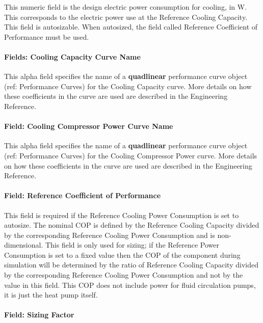 This numeric field is the design electric power consumption for cooling, in W. This corresponds to the electric power use at the Reference Cooling Capacity. This field is autosizable. When autosized, the field called Reference Coefficient of Performance must be used.

\paragraph{Fields: Cooling Capacity Curve Name}\label{fields-cooling-capacity-curve-name}

This alpha field specifies the name of a \textbf{quadlinear} performance curve object (ref: Performance Curves) for the Cooling Capacity curve. More details on how these coefficients in the curve are used are described in the Engineering Reference.

\paragraph{Field: Cooling Compressor Power Curve Name}\label{field-cooling-compressor-power-curve-name}

This alpha field specifies the name of a \textbf{quadlinear} performance curve object (ref: Performance Curves) for the Cooling Compressor Power curve. More details on how these coefficients in the curve are used are described in the Engineering Reference.

\paragraph{Field: Reference Coefficient of Performance}\label{field-cooling-nom-COP}

This field is required if the Reference Cooling Power Consumption is set to autosize. The nominal COP is defined by the Reference Cooling Capacity divided by the corresponding Reference Cooling Power Consumption and is non-dimensional. This field is only used for sizing; if the Reference Power Consumption is set to a fixed value then the COP of the component during simulation will be determined by the ratio of Reference Cooling Capacity divided by the corresponding Reference Cooling Power Consumption and not by the value in this field. This COP does not include power for fluid circulation pumps, it is just the heat pump itself.

\paragraph{Field: Sizing Factor}\label{field-cooling-siz-fac}

